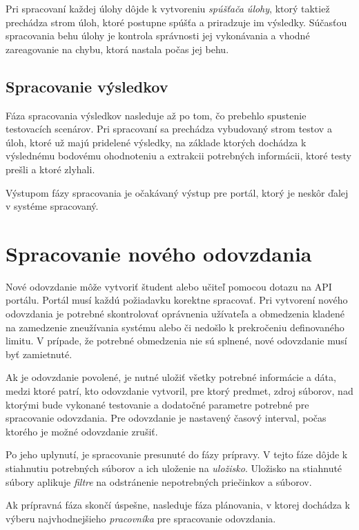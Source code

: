 \documentclass[
  digital, %
  twoside, %
  table,   %
  lof,     %
  lot,     %
]{fithesis3}
\begin{document}
Pri spracovaní každej úlohy dôjde k vytvoreniu \emph{spúšťača úlohy}, ktorý taktiež prechádza strom úloh, ktoré postupne spúšťa a priradzuje im výsledky. Súčasťou spracovania behu úlohy je kontrola správnosti jej vykonávania a vhodné zareagovanie na chybu, ktorá nastala počas jej behu.

\subsection{Spracovanie výsledkov}

Fáza spracovania výsledkov nasleduje až po tom, čo prebehlo spustenie testovacích scenárov. Pri spracovaní sa prechádza vybudovaný strom testov a úloh, ktoré už majú pridelené výsledky, na základe ktorých dochádza k výslednému bodovému ohodnoteniu a extrakcii potrebných informácii, ktoré testy prešli a ktoré zlyhali.

Výstupom fázy spracovania je očakávaný výstup pre portál, ktorý je neskôr ďalej v systéme spracovaný. 



\section{Spracovanie nového odovzdania}

Nové odovzdanie môže vytvoriť študent alebo učiteľ pomocou dotazu na API portálu. Portál musí každú požiadavku korektne spracovať. Pri vytvorení nového odovzdania je potrebné skontrolovať oprávnenia užívateľa a obmedzenia kladené na zamedzenie zneužívania systému alebo či nedošlo k prekročeniu definovaného limitu. V prípade, že potrebné obmedzenia nie sú splnené, nové odovzdanie musí byť zamietnuté.

Ak je odovzdanie povolené, je nutné uložiť všetky potrebné informácie a dáta, medzi ktoré patrí, kto odovzdanie vytvoril, pre ktorý predmet, zdroj súborov, nad ktorými bude vykonané testovanie a dodatočné parametre potrebné pre spracovanie odovzdania. Pre odovzdanie je nastavený časový interval, počas ktorého je možné odovzdanie zrušiť.

Po jeho uplynutí, je spracovanie presunuté do fázy prípravy. V tejto fáze dôjde k stiahnutiu potrebných súborov a ich uloženie na \emph{uložisko}. Uložisko na stiahnuté súbory aplikuje \emph{filtre} na odstránenie nepotrebných priečinkov a súborov.

Ak prípravná fáza skončí úspešne, nasleduje fáza plánovania, v ktorej dochádza k výberu najvhodnejšieho \emph{pracovníka} pre spracovanie odovzdania. 
\end{document}
